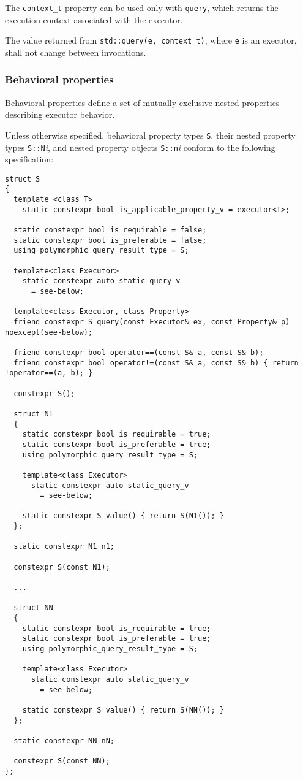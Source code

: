 \documentclass[a4paper,12pt,notitlepage,twoside,openright]{article}
\begin{document}
The \texttt{context_t} property can be used only with
\texttt{query}, which returns the execution context
associated with the executor.

The value returned from \texttt{std::query(e, context_t)},
where \texttt{e} is an executor, shall not change between
invocations.

\hypertarget{behavioral-properties}{%
\subsubsection{Behavioral properties}\label{behavioral-properties}}

Behavioral properties define a set of mutually-exclusive nested
properties describing executor behavior.

Unless otherwise specified, behavioral property types
\texttt{S}, their nested property types
\texttt{S::N}\emph{i}, and nested property objects
\texttt{S::n}\emph{i} conform to the following
specification:

\begin{verbatim}
struct S
{
  template <class T>
    static constexpr bool is_applicable_property_v = executor<T>;

  static constexpr bool is_requirable = false;
  static constexpr bool is_preferable = false;
  using polymorphic_query_result_type = S;

  template<class Executor>
    static constexpr auto static_query_v
      = see-below;

  template<class Executor, class Property>
  friend constexpr S query(const Executor& ex, const Property& p) noexcept(see-below);

  friend constexpr bool operator==(const S& a, const S& b);
  friend constexpr bool operator!=(const S& a, const S& b) { return !operator==(a, b); }

  constexpr S();

  struct N1
  {
    static constexpr bool is_requirable = true;
    static constexpr bool is_preferable = true;
    using polymorphic_query_result_type = S;

    template<class Executor>
      static constexpr auto static_query_v
        = see-below;

    static constexpr S value() { return S(N1()); }
  };

  static constexpr N1 n1;

  constexpr S(const N1);

  ...

  struct NN
  {
    static constexpr bool is_requirable = true;
    static constexpr bool is_preferable = true;
    using polymorphic_query_result_type = S;

    template<class Executor>
      static constexpr auto static_query_v
        = see-below;

    static constexpr S value() { return S(NN()); }
  };

  static constexpr NN nN;

  constexpr S(const NN);
};
\end{verbatim}
\end{document}
